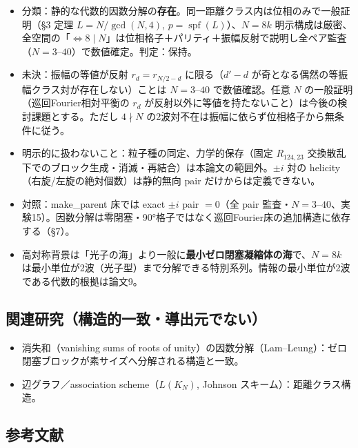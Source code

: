 \documentclass[
  a4paper,
]{ltjsarticle}
\providecommand{\tightlist}{%
  \setlength{\itemsep}{0pt}\setlength{\parskip}{0pt}}
\begin{document}
\begin{itemize}
\tightlist
\item
  分類：静的な代数的因数分解の\textbf{存在}。同一距離クラス内は位相のみで一般証明（§3
  定理 \(L=N/\gcd(N,4)\), \(p=\operatorname{spf}(L)\)）、\(N=8k\)
  明示構成は厳密、全空間の「\(\iff 8\mid N\)」は位相格子＋パリティ＋振幅反射で説明し全ペア監査（\(N=3\)--\(40\)）で数値確定。判定：保持。
\item
  未決：振幅の等値が反射 \(r_d=r_{N/2-d}\) に限る（\(d'-d\)
  が奇となる偶然の等振幅クラス対が存在しない）ことは \(N=3\)--\(40\)
  で数値確認。任意 \(N\) の一般証明（巡回Fourier相対平衡の \(r_d\)
  が反射以外に等値を持たないこと）は今後の検討課題とする。ただし
  \(4\nmid N\) の2波対不在は振幅に依らず位相格子から無条件に従う。
\item
  明示的に扱わないこと：粒子種の同定、力学的保存（固定 \(R_{124,23}\)
  交換散乱下でのブロック生成・消滅・再結合）は本論文の範囲外。\(\pm i\)
  対の helicity（右旋/左旋の絶対個数）は静的無向 pair
  だけからは定義できない。
\item
  対照：make\_parent 床では exact \(\pm i\) pair \(=0\)（全 pair
  監査・\(N=3\)--\(40\)、実験15）。因数分解は零閉塞・90°格子ではなく巡回Fourier床の追加構造に依存する（§7）。
\item
  高対称背景は「光子の海」より一般に\textbf{最小ゼロ閉塞凝縮体の海}で、\(N=8k\)
  は最小単位が2波（光子型）まで分解できる特別系列。情報の最小単位が2波である代数的根拠は論文9。
\end{itemize}

\subsection{関連研究（構造的一致・導出元でない）}\label{ux95a2ux9023ux7814ux7a76ux69cbux9020ux7684ux4e00ux81f4ux5c0eux51faux5143ux3067ux306aux3044}

\begin{itemize}
\tightlist
\item
  消失和（vanishing sums of roots of
  unity）の因数分解（Lam--Leung）：ゼロ閉塞ブロックが素サイズへ分解される構造と一致。
\item
  辺グラフ／association scheme（\(L(K_N)\), Johnson
  スキーム）：距離クラス構造。
\end{itemize}

\subsection{参考文献}\label{ux53c2ux8003ux6587ux732e}
\end{document}
